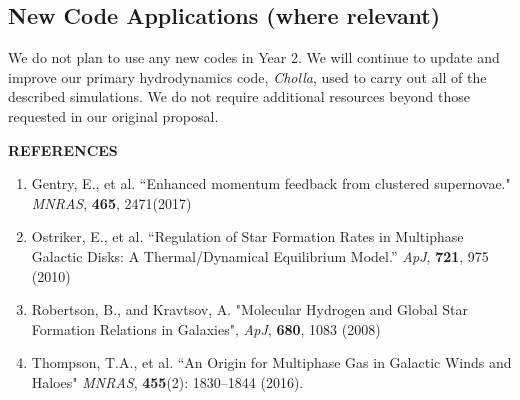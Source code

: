 \documentclass[11pt,letterpaper,english]{article}
\begin{document}
\subsection{New Code Applications (where relevant)} 





We do not plan to use any new codes in Year 2. We will continue to update and improve our primary hydrodynamics code, \textit{Cholla}, used to carry out all of the described simulations. We do not require additional
resources beyond those requested in our original proposal.

\vspace{.08in}
\textbf{REFERENCES}
\vspace{6pt}


\begin{enumerate}\itemsep0pt

\item Gentry, E., et al. ``Enhanced momentum feedback from clustered supernovae." \emph{MNRAS}, \textbf{465}, 2471(2017)
\item Ostriker, E., et al. ``Regulation of Star Formation Rates in Multiphase Galactic Disks: A Thermal/Dynamical Equilibrium Model.'' \emph{ApJ}, \textbf{721}, 975 (2010)
\item Robertson, B., and Kravtsov, A. "Molecular Hydrogen and Global Star Formation Relations in Galaxies", \emph{ApJ}, \textbf{680}, 1083 (2008)
\item Thompson, T.A., et al. ``An Origin for Multiphase Gas in Galactic Winds and Haloes" \emph{MNRAS}, \textbf{455}(2): 1830--1844 (2016). \\

\end{enumerate}
\end{document}
